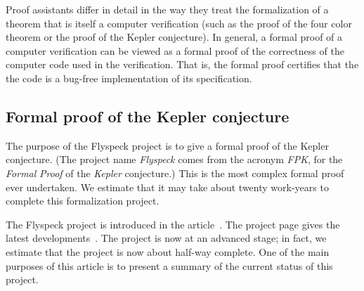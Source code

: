 \documentclass[11pt]{amsart}
\begin{document}
Proof assistants differ in detail in the way they treat the formalization
of  a theorem that is itself a computer verification (such as
the proof of the four color theorem or the proof of the Kepler conjecture).
In general, a formal proof of a computer verification can be viewed
as a formal proof of the correctness of the computer code used in the
verification.  That is, the formal proof certifies that the the code
is a bug-free implementation of its specification.





\subsection*{Formal proof of the Kepler conjecture}
\label{sec:intro}

The purpose of the Flyspeck project is to give a formal proof of the Kepler conjecture.  (The project name {\it Flyspeck} comes from the acronym {\it FPK}, for the {\it Formal} {\it Proof} of the {\it Kepler} conjecture.)  This is the most complex formal proof ever undertaken.  We estimate that it may take about twenty work-years to complete this formalization project.  

The Flyspeck project is introduced in the article~\cite{hales:DSP:2006:432}.
The project page gives the latest developments~\cite{website:FlyspeckProject}.
The project is now at an advanced stage; in fact, we estimate that the project is now about half-way complete.  
One of the main purposes of this article is to present a summary of the current status of this project.
\end{document}
